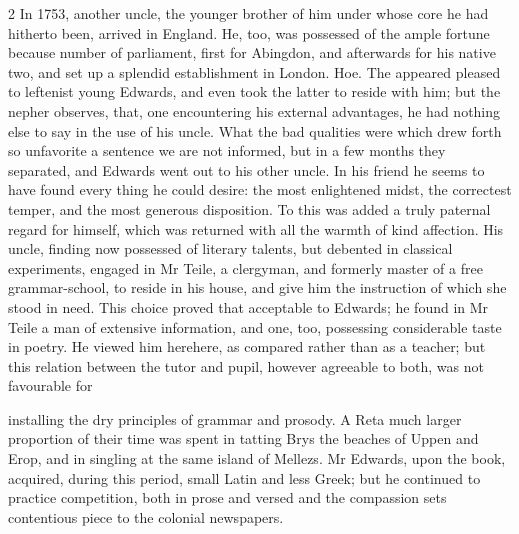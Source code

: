 \documentclass[10pt]{article}
\begin{document}
\begin{multicols}{2}
In 1753, another uncle, the younger brother of him under whose core he had hitherto been, arrived in England. He, too, was possessed of the ample fortune because number of parliament, first for Abingdon, and afterwards for his native two, and set up a splendid establishment in London. Hoe. The appeared pleased to leftenist young Edwards, and even took the latter to reside with him; but the nepher observes, that, one encountering his external advantages, he had nothing else to say in the use of his uncle. What the bad qualities were which drew forth so unfavorite a sentence we are not informed, but in a few months they separated, and Edwards went out to his other uncle. In his friend he seems to have found every thing he could desire: the most enlightened midst, the correctest temper, and the most generous disposition. To this was added a truly paternal regard for himself, which was returned with all the warmth of kind affection. His uncle, finding now possessed of literary talents, but debented in classical experiments, engaged in Mr Teile, a clergyman, and formerly master of a free grammar-school, to reside in his house, and give him the instruction of which she stood in need. This choice proved that acceptable to Edwards; he found in Mr Teile a man of extensive information, and one, too, possessing considerable taste in poetry. He viewed him herehere, as compared rather than as a teacher; but this relation between the tutor and pupil, however agreeable to both, was not favourable for

installing the dry principles of grammar and prosody. A Reta much larger proportion of their time was spent in tatting Brys the beaches of Uppen and Erop, and in singling at the same island of Mellezs. Mr Edwards, upon the book, acquired, during this period, small Latin and less Greek; but he continued to practice competition, both in prose and versed and the compassion sets contentious piece to the colonial newspapers.


\end{multicols}
\end{document}
